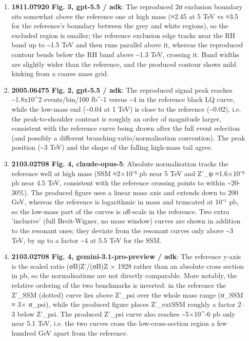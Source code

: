 \begin{enumerate}
\item \textbf{1811.07920 Fig. 3, gpt-5.5 / adk}: The reproduced 2σ exclusion boundary sits somewhat above the reference one at high mass (≈2.45 at 5 TeV vs ≈3.5 for the reference's boundary between the grey and white regions), so the excluded region is smaller; the reference exclusion edge tracks near the RH band up to \textasciitilde{}1.5 TeV and then runs parallel above it, whereas the reproduced contour bends below the RH band above \textasciitilde{}1.3 TeV, crossing it. Band widths are slightly wider than the reference, and the produced contour shows mild kinking from a coarse mass grid.
\item \textbf{2005.06475 Fig. 2, gpt-5.5 / adk}: The reproduced signal peak reaches \textasciitilde{}1.8x10\textasciicircum{}2 events/bin/100 fb\textasciicircum{}-1 versus \textasciitilde{}4 in the reference black LQ curve, while the low-mass end (\textasciitilde{}0.04 at 1 TeV) is close to the reference (\textasciitilde{}0.02), i.e. the peak-to-shoulder contrast is roughly an order of magnitude larger, consistent with the reference curve being drawn after the full event selection (and possibly a different branching-ratio/normalisation convention). The peak position (\textasciitilde{}3 TeV) and the shape of the falling high-mass tail agree.
\item \textbf{2103.02708 Fig. 4, claude-opus-5}: Absolute normalisation tracks the reference well at high mass (SSM ≈2×10⁻⁵ pb near 5 TeV and Z'\_ψ ≈1.6×10⁻⁵ pb near 4.5 TeV, consistent with the reference crossing points to within \textasciitilde{}20-30\%). The produced figure uses a linear mass axis and extends down to 200 GeV, whereas the reference is logarithmic in mass and truncated at 10⁻¹ pb, so the low-mass part of the curves is off-scale in the reference. Two extra 'inclusive' (full Breit-Wigner, no mass window) curves are shown in addition to the resonant ones; they deviate from the resonant curves only above \textasciitilde{}3 TeV, by up to a factor \textasciitilde{}4 at 5.5 TeV for the SSM.
\item \textbf{2103.02708 Fig. 4, gemini-3.1-pro-preview / adk}: The reference y-axis is the scaled ratio (σB)Z'/(σB)Z × 1928 rather than an absolute cross section in pb, so the normalisations are not directly comparable. More notably, the relative ordering of the two benchmarks is inverted: in the reference the Z'\_SSM (dotted) curve lies above Z'\_psi over the whole mass range (σ\_SSM ≈ 3× σ\_psi), while the produced figure places Z'\_extSSM roughly a factor 2–3 below Z'\_psi. The produced Z'\_psi curve also reaches \textasciitilde{}5×10\textasciicircum{}-6 pb only near 5.1 TeV, i.e. the two curves cross the low-cross-section region a few hundred GeV apart from the reference.

\end{enumerate}
